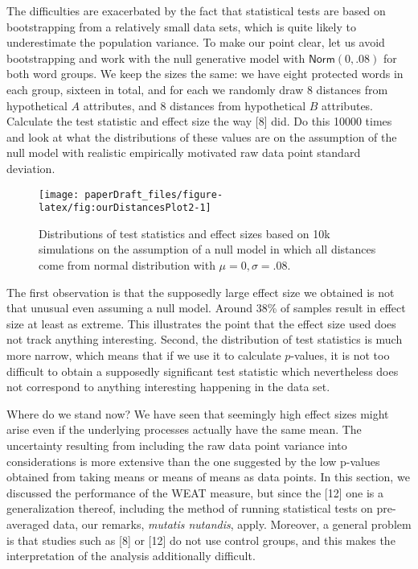 \documentclass[
  12pt,
  dvipsnames,enabledeprecatedfontcommands]{scrartcl}
\begin{document}
The difficulties are exacerbated by the fact that statistical tests are
based on bootstrapping from a relatively small data sets, which is quite
likely to underestimate the population variance. To make our point
clear, let us avoid bootstrapping and work with the null generative
model with \(\mathsf{Norm}(0,.08)\) for both word groups. We keep the
sizes the same: we have eight protected words in each group, sixteen in
total, and for each we randomly draw 8 distances from hypothetical \(A\)
attributes, and \(8\) distances from hypothetical \(B\) attributes.
Calculate the test statistic and effect size the way {[}8{]} did. Do
this 10000 times and look at what the distributions of these values are
on the assumption of the null model with realistic empirically motivated
raw data point standard deviation.

\begin{figure}[H]

\begin{center}\texttt{[image: paperDraft\_files/figure-latex/fig:ourDistancesPlot2-1]} \end{center}

\caption{Distributions of test statistics and effect sizes based on 10k simulations on the assumption of a null model in which all distances come from normal distribution with $\mu =0, \sigma = .08$.}
\label{fig:ourDistances}
\end{figure}

The first observation is that the supposedly large effect size we
obtained is not that unusual even assuming a null model. Around 38\% of
samples result in effect size at least as extreme. This illustrates the
point that the effect size used does not track anything interesting.
Second, the distribution of test statistics is much more narrow, which
means that if we use it to calculate \(p\)-values, it is not too
difficult to obtain a supposedly significant test statistic which
nevertheless does not correspond to anything interesting happening in
the data set.

Where do we stand now? We have seen that seemingly high effect sizes
might arise even if the underlying processes actually have the same
mean. The uncertainty resulting from including the raw data point
variance into considerations is more extensive than the one suggested by
the low p-values obtained from taking means or means of means as data
points. In this section, we discussed the performance of the
\textsf{WEAT} measure, but since the {[}12{]} one is a generalization
thereof, including the method of running statistical tests on
pre-averaged data, our remarks, \emph{mutatis nutandis}, apply.
Moreover, a general problem is that studies such as {[}8{]} or {[}12{]}
do not use control groups, and this makes the interpretation of the
analysis additionally difficult.
\end{document}
